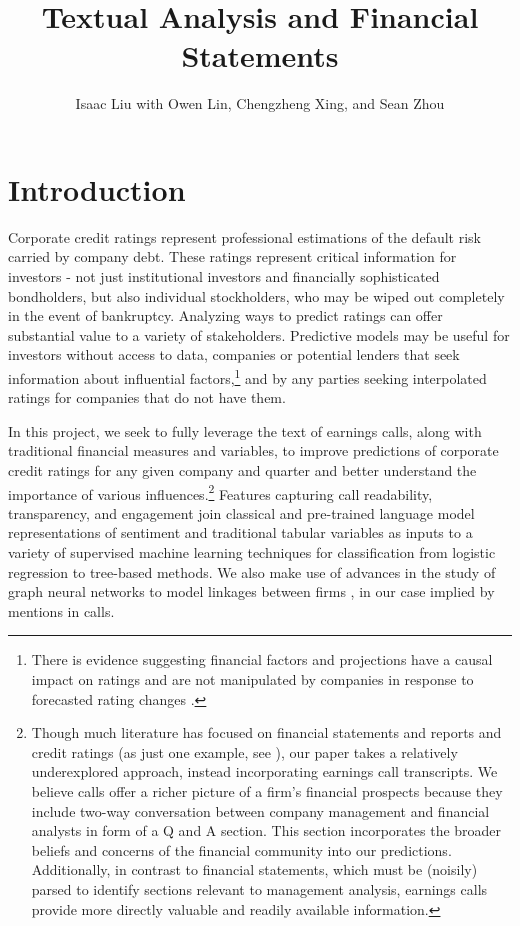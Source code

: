\documentclass{article}[11pt]
\title{Textual Analysis and Financial Statements}
\author{Isaac Liu with Owen Lin, Chengzheng Xing, and Sean Zhou}
\begin{document}
	\maketitle

    \section*{Introduction}

    Corporate credit ratings represent professional estimations of the default risk carried by company debt. These ratings represent critical information for investors - not just institutional investors and financially sophisticated bondholders, but also individual stockholders, who may be wiped out completely in the event of bankruptcy. Analyzing ways to predict ratings can offer substantial value to a variety of stakeholders. Predictive models may be useful for investors without access to data, companies or potential lenders that seek information about influential factors,\footnote{There is evidence suggesting financial factors and projections have a causal impact on ratings and are not manipulated by companies in response to forecasted rating changes \citep{he_impact_2018}.} and by any parties seeking interpolated ratings for companies that do not have them.

    In this project, we seek to fully leverage the text of earnings calls, along with traditional financial measures and variables, to improve predictions of corporate credit ratings for any given company and quarter and better understand the importance of various influences.\footnote{Though much literature has focused on financial statements and reports and credit ratings (as just one example, see \cite{makwana_understanding_2022}), our paper takes a relatively underexplored approach, instead incorporating earnings call transcripts. We believe calls offer a richer picture of a firm's financial prospects because they include two-way conversation between company management and financial analysts in form of a Q and A section. This section incorporates the broader beliefs and concerns of the financial community into our predictions. Additionally, in contrast to financial statements, which must be (noisily) parsed to identify sections relevant to management analysis, earnings calls provide more directly valuable and readily available information.} Features capturing call readability, transparency, and engagement join classical and pre-trained language model representations of sentiment \citep{araci_finbert_2019} and traditional tabular variables as inputs to a variety of supervised machine learning techniques for classification from logistic regression to tree-based methods. We also make use of advances in the study of graph neural networks to model linkages between firms \citep{das_credit_2023}, in our case implied by mentions in calls.
\end{document}
